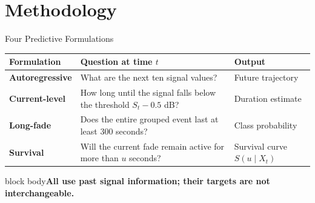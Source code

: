 \documentclass[aspectratio=169,10pt]{beamer}
\newcommand{\takeaway}[1]{\vfill\begin{beamercolorbox}[sep=2mm,wd=\textwidth]{block body}\small\textbf{#1}\end{beamercolorbox}}
\begin{document}
\section{Methodology}
\begin{frame}{Four Predictive Formulations}
\renewcommand{\arraystretch}{1.7}
\begin{tabularx}{\textwidth}{@{}p{36mm}X p{39mm}@{}}
\toprule
\textbf{Formulation} & \textbf{Question at time $t$} & \textbf{Output}\\\midrule
\textcolor{forecast}{\textbf{Autoregressive}} & What are the next ten signal values? & Future trajectory\\
\textcolor{current}{\textbf{Current-level}} & How long until the signal falls below the threshold $S_t-0.5$ dB? & Duration estimate\\
\textcolor{longfade}{\textbf{Long-fade}} & Does the entire grouped event last at least 300 seconds? & Class probability\\
\textcolor{survival}{\textbf{Survival}} & Will the current fade remain active for more than $u$ seconds? & Survival curve $S(u\mid X_t)$\\
\bottomrule
\end{tabularx}
\takeaway{All use past signal information; their targets are not interchangeable.}
\end{frame}
\end{document}
